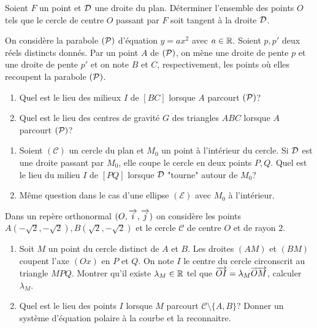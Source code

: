 \begin{exercice}
  Soient \(F\) un point et \(\Dr\) une droite du plan. Déterminer 
  l'ensemble des points \(O\) tels que le cercle de centre \(O\) passant 
  par \(F\) soit tangent à la droite \(\Dr\).
\end{exercice}

\begin{exercice}
  On considère la parabole \((\P)\) d'équation \(y = ax^2\) avec \(a \in 
  \R\). Soient \(p, p'\) deux réels distincts donnés. Par un point \(A\) 
  de \((\P)\), on mène une droite de pente \(p\) et une droite de pente 
  \(p'\) et on note \(B\) et \(C\), respectivement, les points où elles 
  recoupent la parabole \((\P)\).
  \begin{enumerate}
    \item Quel est le lieu des milieux \(I\) de \([BC]\) lorsque \(A\) 
      parcourt \((\P)\)?
    \item Quel est le lieu des centres de gravité \(G\) des triangles 
      \(ABC\) lorsque \(A\) parcourt \((\P)\)?
  \end{enumerate}
\end{exercice}

\begin{exercice}
  \begin{enumerate}
    \item Soient \((\mathcal{C})\) un cercle du plan et \(M_0\) un point 
      à l'intérieur du cercle. Si \(\Dr\) est une droite passant par 
      \(M_0\), elle coupe le cercle en deux points \(P, Q\). Quel est le 
      lieu du milieu \(I\) de \([PQ]\) lorsque \(\Dr\) "tourne" autour 
      de \(M_0\)?
    \item Même question dans le cas d'une ellipse \((\mathcal{E})\) avec 
      \(M_0\) à l'intérieur.
  \end{enumerate}
\end{exercice}

\begin{exercice}
  Dans un repère orthonormal \((O, \vi, \vj)\) on considère les points 
  \(A(-\sqrt{2}, -\sqrt{2}), B(\sqrt{2}, -\sqrt{2})\) et le cercle 
  \(\mathcal{C}\) de centre \(O\) et de rayon \(2\).
  \begin{enumerate}
    \item Soit \(M\) un point du cercle distinct de \(A\) et \(B\). Les 
      droites \((AM)\) et \((BM)\) coupent l'axe \((Ox)\) en \(P\) et 
      \(Q\). On note \(I\) le centre du cercle circonscrit au triangle 
      \(MPQ\). Montrer qu'il existe \(\lambda_M \in \R\) tel que 
      \(\vect{OI} = \lambda_M \vect{OM}\), calculer \(\lambda_M\).
    \item Quel est le lieu des points \(I\) lorsque \(M\) parcourt 
      \(\mathcal{C}\setminus\{A, B\}\)? Donner un système d'équation 
      polaire à la courbe et la reconnaitre.
  \end{enumerate}
\end{exercice}

